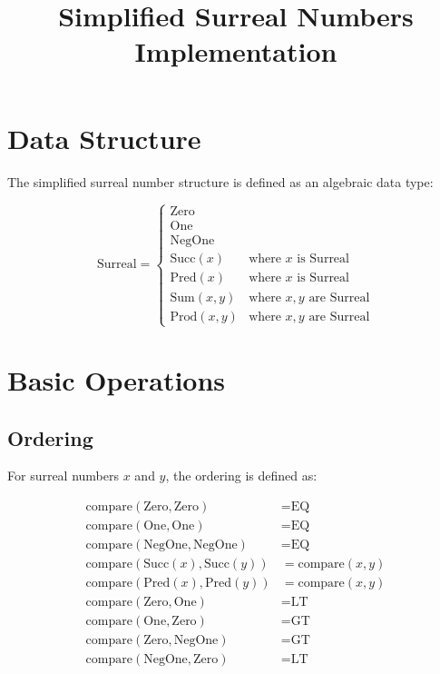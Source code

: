 \documentclass{article}
\title{Simplified Surreal Numbers Implementation}
\author{}
\date{}
\begin{document}
\maketitle

\section{Data Structure}
The simplified surreal number structure is defined as an algebraic data type:

\begin{equation}
\text{Surreal} = \begin{cases}
\text{Zero} \\
\text{One} \\
\text{NegOne} \\
\text{Succ}(x) & \text{where } x \text{ is Surreal} \\
\text{Pred}(x) & \text{where } x \text{ is Surreal} \\
\text{Sum}(x, y) & \text{where } x, y \text{ are Surreal} \\
\text{Prod}(x, y) & \text{where } x, y \text{ are Surreal}
\end{cases}
\end{equation}

\section{Basic Operations}

\subsection{Ordering}
For surreal numbers $x$ and $y$, the ordering is defined as:

\begin{align*}
\text{compare}(\text{Zero}, \text{Zero}) &= \text{EQ} \\
\text{compare}(\text{One}, \text{One}) &= \text{EQ} \\
\text{compare}(\text{NegOne}, \text{NegOne}) &= \text{EQ} \\
\text{compare}(\text{Succ}(x), \text{Succ}(y)) &= \text{compare}(x, y) \\
\text{compare}(\text{Pred}(x), \text{Pred}(y)) &= \text{compare}(x, y) \\
\text{compare}(\text{Zero}, \text{One}) &= \text{LT} \\
\text{compare}(\text{One}, \text{Zero}) &= \text{GT} \\
\text{compare}(\text{Zero}, \text{NegOne}) &= \text{GT} \\
\text{compare}(\text{NegOne}, \text{Zero}) &= \text{LT}
\end{align*}
\end{document}
